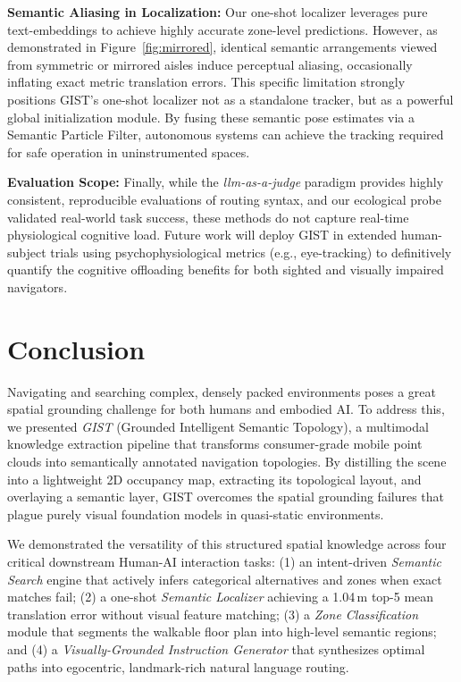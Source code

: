 \documentclass[sigconf,anonymous,review]{acmart}
\begin{document}
\textbf{Semantic Aliasing in Localization:} Our one-shot localizer leverages pure text-embeddings to achieve highly accurate zone-level predictions. However, as demonstrated in Figure~\ref{fig:mirrored}, identical semantic arrangements viewed from symmetric or mirrored aisles induce perceptual aliasing, occasionally inflating exact metric translation errors. This specific limitation strongly positions GIST's one-shot localizer not as a standalone tracker, but as a powerful global initialization module. By fusing these semantic pose estimates via a Semantic Particle Filter, autonomous systems can achieve the tracking required for safe operation in uninstrumented spaces.

\textbf{Evaluation Scope:} Finally, while the \textit{llm-as-a-judge} paradigm provides highly consistent, reproducible evaluations of routing syntax, and our ecological probe validated real-world task success, these methods do not capture real-time physiological cognitive load. Future work will deploy GIST in extended human-subject trials using psychophysiological metrics (e.g., eye-tracking) to definitively quantify the cognitive offloading benefits for both sighted and visually impaired navigators.

\section{Conclusion}

Navigating and searching complex, densely packed environments poses a great spatial grounding challenge for both humans and embodied AI. To address this, we presented \emph{GIST} (Grounded Intelligent Semantic Topology), a multimodal knowledge extraction pipeline that transforms consumer-grade mobile point clouds into semantically annotated navigation topologies. By distilling the scene into a lightweight 2D occupancy map, extracting its topological layout, and overlaying a semantic layer, GIST overcomes the spatial grounding failures that plague purely visual foundation models in quasi-static environments.

We demonstrated the versatility of this structured spatial knowledge across four critical downstream Human-AI interaction tasks: (1) an intent-driven \emph{Semantic Search} engine that actively infers categorical alternatives and zones when exact matches fail; (2) a one-shot \emph{Semantic Localizer} achieving a 1.04\,m top-5 mean translation error without visual feature matching; (3) a \emph{Zone Classification} module that segments the walkable floor plan into high-level semantic regions; and (4) a \emph{Visually-Grounded Instruction Generator} that synthesizes optimal paths into egocentric, landmark-rich natural language routing. 
\end{document}
